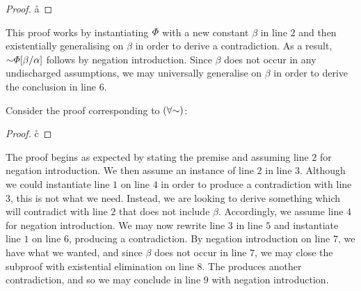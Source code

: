 \begin{proof}
	      \pr{}
    \open
            
             
        \r{a}
    \close
       
         
\end{proof}

This proof works by instantiating $\varPhi$ with a new constant $\beta$ in line $2$ and then existentially generalising on $\beta$ in order to derive a contradiction.
As a result, $\enot\metaA\unisub{\beta}{\alpha}$ follows by negation introduction. 
Since $\beta$ does not occur in any undischarged assumptions, we may universally generalise on $\beta$ in order to derive the conclusion in line $6$. 

Consider the proof corresponding to $(\forall\enot)$: 

\begin{proof}
	      \pr{}
    \open
              \as{}
        \open
            
            \open
                \as{}
                \r{c}
                
            \close
            
        \close
        
    \close
         
\end{proof}

The proof begins as expected by stating the premise and assuming line $2$ for negation introduction. 
We then assume an instance of line $2$ in line $3$.
Although we could instantiate line $1$ on line $4$ in order to produce a contradiction with line $3$, this is not what we need.
Instead, we are looking to derive something which will contradict with line $2$ that does not include $\beta$. 
Accordingly, we assume line $4$ for negation introduction. 
We may now rewrite line $3$ in line $5$ and instantiate line $1$ on line $6$, producing a contradiction. 
By negation introduction on line $7$, we have what we wanted, and since $\beta$ does not occur in line $7$, we may close the subproof with existential elimination on line $8$.
The produces another contradiction, and so we may conclude in line $9$ with negation introduction. 

